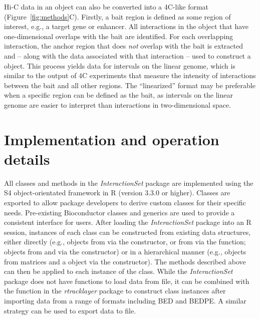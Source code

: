 \documentclass[10pt,a4paper,twocolumn]{article}
\begin{document}
Hi-C data in an  object can also be converted into a 4C-like format (Figure~\ref{fig:methods}C).
Firstly, a bait region is defined as some region of interest, e.g., a target gene or enhancer.
All interactions in the  object that have one-dimensional overlaps with the bait are identified.
For each overlapping interaction, the anchor region that does \textit{not} overlap with the bait is extracted and -- along with the data associated with that interaction -- used to construct a  object.
This process yields data for intervals on the linear genome, which is similar to the output of 4C experiments \cite{simonis2006nuclear} that measure the intensity of interactions between the bait and all other regions.
The ``linearized'' format may be preferable when a specific region can be defined as the bait, as intervals on the linear genome are easier to interpret than interactions in two-dimensional space.

\section*{Implementation and operation details}
All classes and methods in the \textit{InteractionSet} package are implemented using the S4 object-orientated framework in R (version 3.3.0 or higher).
Classes are exported to allow package developers to derive custom classes for their specific needs.
Pre-existing Bioconductor classes and generics are used to provide a consistent interface for users.
After loading the \textit{InteractionSet} package into an R session, instances of each class can be constructed from existing data structures, either directly (e.g.,  objects from  via the  constructor, or from  via the  function;  objects from  and  via the  constructor) or in a hierarchical manner (e.g.,  objects from matrices and a  object via the  constructor).
The methods described above can then be applied to each instance of the class.
While the \textit{InteractionSet} package does not have functions to load data from file, it can be combined with the  function in the \textit{rtracklayer} package \cite{lawrence2009rtracklayer} to construct class instances after importing data from a range of formats including BED and BEDPE.
A similar strategy can be used to export data to file.
\end{document}
